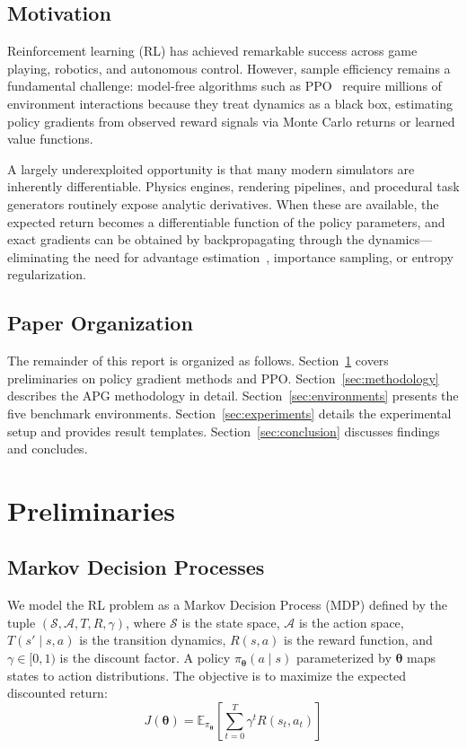 \documentclass[11pt,a4paper]{article}
\newcommand{\E}{\mathbb{E}}
\newcommand{\cA}{\mathcal{A}}
\newcommand{\cS}{\mathcal{S}}
\newcommand{\btheta}{\bm{\theta}}
\begin{document}
\subsection{Motivation}
\label{sec:motivation}

Reinforcement learning (RL) has achieved remarkable success across game playing, robotics, and autonomous control. However, sample efficiency remains a fundamental challenge: model-free algorithms such as PPO~\cite{schulman2017ppo} require millions of environment interactions because they treat dynamics as a black box, estimating policy gradients from observed reward signals via Monte Carlo returns or learned value functions.

A largely underexploited opportunity is that many modern simulators are inherently differentiable. Physics engines, rendering pipelines, and procedural task generators routinely expose analytic derivatives. When these are available, the expected return becomes a differentiable function of the policy parameters, and exact gradients can be obtained by backpropagating through the dynamics—eliminating the need for advantage estimation~\cite{schulman2016gae}, importance sampling, or entropy regularization.

\subsection{Paper Organization}
\label{sec:organization}

The remainder of this report is organized as follows. Section~\ref{sec:preliminaries} covers preliminaries on policy gradient methods and PPO. Section~\ref{sec:methodology} describes the APG methodology in detail. Section~\ref{sec:environments} presents the five benchmark environments. Section~\ref{sec:experiments} details the experimental setup and provides result templates. Section~\ref{sec:conclusion} discusses findings and concludes.

\section{Preliminaries}
\label{sec:preliminaries}

\subsection{Markov Decision Processes}
\label{sec:mdp}

We model the RL problem as a Markov Decision Process (MDP) defined by the tuple $(\cS, \cA, T, R, \gamma)$, where $\cS$ is the state space, $\cA$ is the action space, $T(s' \mid s, a)$ is the transition dynamics, $R(s, a)$ is the reward function, and $\gamma \in [0, 1)$ is the discount factor. A policy $\pi_{\btheta}(a \mid s)$ parameterized by $\btheta$ maps states to action distributions. The objective is to maximize the expected discounted return:
\begin{equation}
  J(\btheta) = \E_{\pi_{\btheta}}\left[\sum_{t=0}^{T} \gamma^t R(s_t, a_t)\right]
  \label{eq:objective}
\end{equation}
\end{document}
